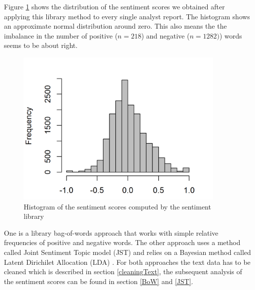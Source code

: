 
Figure \ref{fig:BoWSentiment} shows the distribution of the sentiment scores we obtained after applying this library method to every single analyst report. The histogram shows an approximate normal distribution around zero. This also means the the imbalance in the number of positive ($n = 218$) and negative ($n = 1282)$) words seems to be about right.
\begin{figure}[h]
\centering
\includegraphics[width=4in]{figures/2SentimentsBOW_Histogram.png}
\caption{Histogram of the sentiment scores computed by the sentiment library}
\label{fig:BoWSentiment}
\end{figure}

One is a library bag-of-words approach that works with simple relative frequencies of positive and negative words. The other approach uses a  method called Joint Sentiment Topic model (JST) \citep{lin2009joint} and relies on a Bayesian method called Latent Dirichilet Allocation (LDA)  \citep{blei2003latent}. For both approaches the text data has to be cleaned which is described in section \ref{cleaningText}, the subsequent analysis of the sentiment scores can be found in section \ref{BoW} and \ref{JST}.

